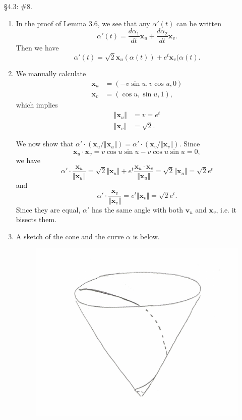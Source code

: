 \documentclass[10pt]{report}
\begin{document}
\begin{exer}[]
\S 4.3: \#8.
\end{exer}
\begin{enumerate}
	\item In the proof of Lemma 3.6, we see that any $\alpha'(t)$ can be written
		\[
			\alpha'(t) = \frac{d \alpha_1}{d t} \mathbf{x}_{u} + \frac{d \alpha_2}{d t} \mathbf{x}_{v}.
		\] 
		Then we have
		\[
			\alpha'(t) = \sqrt{2} \mathbf{x}_{u}(\alpha(t)) + e^t \mathbf{x}_{v}(\alpha(t).
		\] 

		\item We manually calculate
			\begin{align*}
				\mathbf{x}_{u} &= (-v \sin u, v \cos u, 0) \\
				\mathbf{x}_{v} &= (\cos u, \sin u, 1),
			\end{align*}
			which implies
			\begin{align*}
				{\Vert{\mathbf{x}_{u}}\Vert} &= v = e^t \\
				{\Vert{\mathbf{x}_{v}}\Vert} &= \sqrt{2}.
			\end{align*}

			We now show that $\alpha' \cdot (\mathbf{x}_{u}/{\Vert{\mathbf{x}_{u}}\Vert}) = \alpha' \cdot (\mathbf{x}_{v}/{\Vert{\mathbf{x}_{v}}\Vert})$. Since 
			\[
			\mathbf{x}_{u} \cdot \mathbf{x}_{v} = v\cos u \sin u - v \cos u \sin u = 0,
			\] we have
			\[
			\alpha' \cdot \frac{\mathbf{x}_{u}}{{\Vert{\mathbf{x}_{u}}\Vert}} = \sqrt{2} {\Vert{\mathbf{x}_{u}}\Vert}+ e^t \frac{\mathbf{x}_{u}\cdot \mathbf{x}_{v}}{{\Vert{\mathbf{x}_{u}}\Vert}}  = \sqrt{2} {\Vert{\mathbf{x}_{u}}\Vert} = \sqrt{2} e^t 
			\] and
			\[
			\alpha' \cdot \frac{\mathbf{x}_{v}}{{\Vert{\mathbf{x}_{v}}\Vert}} = e^t {\Vert{\mathbf{x}_{v}}\Vert} = \sqrt{2} e^t.
			\] Since they are equal, $\alpha'$ has the same angle with both $\mathbf{v}_{u}$ and $\mathbf{x}_{v}$, i.e. it bisects them.
\newpage
		\item A sketch of the cone and the curve $\alpha$ is below.
			\begin{figure}[H]
				\centering
				\includegraphics[scale=0.6]{fig/cone.pdf}
			\end{figure}
			
\end{enumerate}
\end{document}
